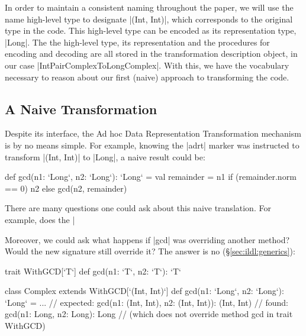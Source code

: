 In order to maintain a consistent naming throughout the paper, we will use the name high-level type to designate |(Int, Int)|, which corresponds to the original type in the code. This high-level type can be encoded as its representation type, |Long|. The the high-level type, its representation and the procedures for encoding and decoding are all stored in the transformation description object, in our case |IntPairComplexToLongComplex|. With this, we have the vocabulary necessary to reason about our first (naive) approach to transforming the code.

\subsection{A Naive Transformation}

Despite its interface, the Ad hoc Data Representation Transformation mechanism is by no means simple. For example, knowing the |adrt| marker was instructed to transform |(Int, Int)| to |Long|, a naive result could be:

\begin{lstlisting-nobreak}
def gcd(n1: `Long`, n2: `Long`): `Long` = {
  val remainder = n1 %
  if (remainder.norm == 0) n2 else gcd(n2, remainder)
}
\end{lstlisting-nobreak}

There are many questions one could ask about this naive translation. For example, does the |%

Moreover, we could ask what happens if |gcd| was overriding another method? Would the new signature still override it? The answer is no (\S\ref{sec:ildl:generics}):

\begin{lstlisting-nobreak}
trait WithGCD[`T`] {
  def gcd(n1: `T`, n2: `T`): `T`
}

class Complex extends WithGCD[`(Int, Int)`] {
  def gcd(n1: `Long`, n2: `Long`): `Long` = ...
  // expected: gcd(n1: (Int, Int), n2: (Int, Int)): (Int, Int)
  // found:    gcd(n1: Long, n2: Long): Long
  // (which does not override method gcd in trait WithGCD)
}
\end{lstlisting-nobreak}
%

